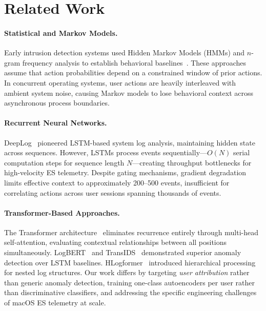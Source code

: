 \documentclass[letterpaper,twocolumn,10pt]{article}
\begin{document}
\section{Related Work}

\paragraph{Statistical and Markov Models.}
Early intrusion detection systems used Hidden Markov Models
(HMMs) and $n$-gram frequency analysis to establish behavioral
baselines~\cite{forrest96}. These approaches assume that action
probabilities depend on a constrained window of prior actions.
In concurrent operating systems, user actions are heavily
interleaved with ambient system noise, causing Markov models to
lose behavioral context across asynchronous process
boundaries.

\paragraph{Recurrent Neural Networks.}
DeepLog~\cite{deeplog} pioneered LSTM-based system log analysis,
maintaining hidden state across sequences. However, LSTMs process
events sequentially---$O(N)$ serial computation steps for sequence
length $N$---creating throughput bottlenecks for high-velocity ES
telemetry. Despite gating mechanisms, gradient degradation limits
effective context to approximately 200--500 events, insufficient
for correlating actions across user sessions spanning thousands of
events.

\paragraph{Transformer-Based Approaches.}
The Transformer architecture~\cite{vaswani} eliminates recurrence
entirely through multi-head self-attention, evaluating contextual
relationships between all positions simultaneously. LogBERT~\cite{logbert}
and TransIDS~\cite{transids} demonstrated superior anomaly detection
over LSTM baselines. HLogformer~\cite{hlogformer} introduced
hierarchical processing for nested log structures. Our work differs
by targeting \emph{user attribution} rather than generic anomaly
detection, training one-class autoencoders per user rather than
discriminative classifiers, and addressing the specific engineering
challenges of macOS ES telemetry at scale.

\end{document}
